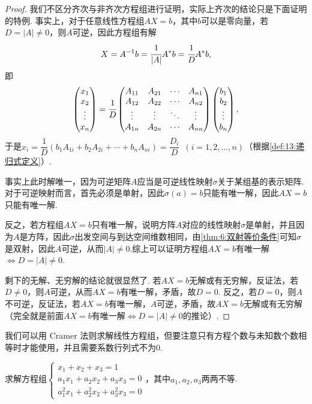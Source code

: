 \begin{proof}
    我们不区分齐次与非齐次方程组进行证明，实际上齐次的结论只是下面证明的特例. 事实上，对于任意线性方程组$AX=b$，其中$b$可以是零向量，若$D=|A|\neq 0$，则$A$可逆，因此方程组有解
    \[X=A^{-1}b=\cfrac{1}{|A|}A^*b=\cfrac{1}{D}A^*b,\]
    即
    \[\begin{pmatrix}
        x_1 \\ x_2 \\ \vdots \\ x_n
    \end{pmatrix}= \cfrac{1}{D}\begin{pmatrix}
        A_{11} & A_{21} & \cdots & A_{n1} \\
        A_{12} & A_{22} & \cdots & A_{n2} \\
        \vdots & \vdots & \ddots & \vdots \\
        A_{1n} & A_{2n} & \cdots & A_{nn}
    \end{pmatrix}\begin{pmatrix}
        b_1 \\ b_2 \\ \vdots \\ b_n
    \end{pmatrix},\]
    于是$x_i=\dfrac{1}{D}(b_1A_{1i}+b_2A_{2i}+\cdots+b_nA_{ni})=\dfrac{D_i}{D}\enspace(i=1,2,\ldots,n)$（根据\autoref{def:13:递归式定义}）.

    事实上此时解唯一，因为可逆矩阵$A$应当是可逆线性映射$\sigma$关于某组基的表示矩阵. 对于可逆映射而言，首先必须是单射，因此$\sigma(a)=b$只能有唯一解，因此$AX=b$只能有唯一解.

    反之，若方程组$AX=b$只有唯一解，说明方阵$A$对应的线性映射$\sigma$是单射，并且因为$A$是方阵，因此$\sigma$出发空间与到达空间维数相同，由\autoref{thm:6:双射等价条件}可知$\sigma$是双射，因此$A$可逆，从而$|A|\neq 0$.综上可以证明方程组$AX=b$有唯一解$\iff D=|A|\neq 0$.

    剩下的无解、无穷解的结论就很显然了. 若$AX=b$无解或有无穷解，反证法，若$D\neq 0$，则$A$可逆，从而$AX=b$有唯一解，矛盾，故$D=0$. 反之，若$D=0$，则$A$不可逆，反证法，若$AX=b$有唯一解，$A$可逆，矛盾，故$AX=b$无解或有无穷解（完全就是前面$AX=b$有唯一解$\iff D=|A|\neq 0$的推论）.
\end{proof}

我们可以用 Cramer 法则求解线性方程组，但要注意只有方程个数与未知数个数相等时才能使用，并且需要系数行列式不为0.
\begin{example}
    求解方程组$\begin{cases}
            x_1+x_2+x_3=1          \\
            a_1x_1+a_2x_2+a_3x_3=0 \\
            a_1^2x_1+a_2^2x_2+a_3^2x_3=0
        \end{cases}$，其中$a_1,a_2,a_3$两两不等.
\end{example}

